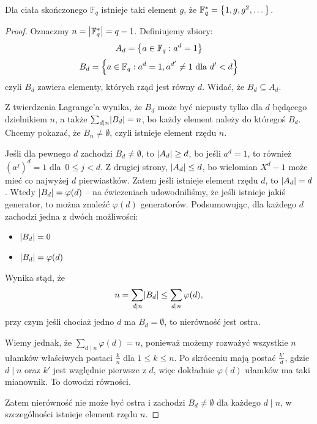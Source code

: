 \begin{theorem}
	Dla ciała skończonego \( \mathbb{F}_q \) istnieje taki element \( g \), że \( \mathbb{F}^{*}_q = \set{1, g, g^2, \text{\dots}} \).
\end{theorem}
\begin{proof}
	Oznaczmy \( n = \left\lvert\mathbb{F}^{*}_q\right\rvert = q-1 \). Definiujemy zbiory:
	\[
		A_d = \set{a \in \mathbb{F}_q : a^d = 1}
	\]
	\[
		B_d = \set{a \in \mathbb{F}_q : a^d = 1, a^{d'} \neq 1 \text{ dla } d' < d}
	\]
	czyli \( B_d \) zawiera elementy, których rząd jest równy \( d \). Widać, że \( B_d \subseteq A_d \).

	Z twierdzenia Lagrange'a wynika, że \( B_d \) może być niepusty tylko dla \( d \) będącego dzielnikiem \( n \), a także \( \sum_{d \mid n} \abs{B_d} = n \), bo każdy element należy do któregoś \( B_d \). Chcemy pokazać, że \( B_n \neq \emptyset \), czyli istnieje element rzędu \( n \).

	Jeśli dla pewnego \( d \) zachodzi \( B_d \neq \emptyset \), to \( \left\lvert A_d\right\rvert \geq d \), bo jeśli \( a^d = 1 \), to również \( (a^j)^d = 1 \) dla~\( 0 \leq j < d \). Z drugiej strony, \( \left\lvert A_d\right\rvert \leq d \), bo wielomian \( X^d-1 \) może mieć co najwyżej \( d \) pierwiastków. Zatem jeśli istnieje element rzędu \( d \), to \( \left\lvert A_d\right\rvert = d \).
	Wtedy \( \left\lvert B_d\right\rvert = \varphi(d) \) -- na ćwiczeniach udowodniliśmy, że jeśli istnieje jakiś generator, to można znaleźć \( \varphi(d) \) generatorów.
	Podsumowując, dla każdego \( d \) zachodzi jedna z dwóch możliwości:
	\begin{itemize}
		\item \( \left\lvert B_d\right\rvert = 0 \)
		\item \( \left\lvert B_d\right\rvert = \varphi(d) \)
	\end{itemize}
	Wynika stąd, że
	\[
		n = \sum_{d \mid n} \abs{B_d} \leq \sum_{d \mid n} \varphi(d),
	\]
	przy czym jeśli chociaż jedno \( d \) ma \( B_d = \emptyset \), to nierówność jest ostra.

	Wiemy jednak, że \( \sum_{d \mid n} \varphi(d) = n \), ponieważ możemy rozważyć wszystkie \( n \) ułamków właściwych postaci \( \frac{k}{n} \) dla \( 1 \leq k \leq n \).
	Po skróceniu mają postać \( \frac{k'}{d} \), gdzie \( d \mid n \) oraz \( k' \) jest względnie pierwsze z \( d \), więc dokładnie \( \varphi(d) \) ułamków ma taki mianownik. To dowodzi równości.

	Zatem nierówność nie może być ostra i zachodzi \( B_d \neq \emptyset \) dla każdego \( d \mid n \), w szczególności istnieje element rzędu \( n \).
\end{proof}
